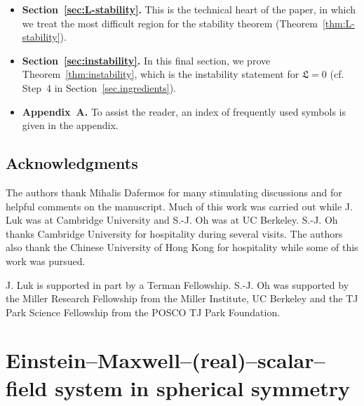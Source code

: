 \documentclass[10pt, reqno]{amsart}
\theoremstyle{definition}
\theoremstyle{remark}
\theoremstyle{conjecture}
\numberwithin{equation}{section}
\newcommand{\0}{\emptyset}
\begin{document}
\begin{itemize}
\item {\bf Section~\ref{sec:L-stability}.} This is the technical heart of the paper, in which we treat the most difficult region for the stability theorem (Theorem~\ref{thm:L-stability}).
\item {\bf Section~\ref{sec:instability}.} In this final section, we prove Theorem~\ref{thm:instability}, which is the instability statement for $\mathfrak L=0$ (cf. Step~4 in Section~\ref{sec.ingredients}).
\item {\bf Appendix~A.} To assist the reader, an index of frequently used symbols is given in the appendix.
\end{itemize}


\subsection*{Acknowledgments} The authors thank Mihalis Dafermos for many stimulating discussions and for helpful comments on the manuscript. Much of this work was carried out while J. Luk was at Cambridge University and S.-J. Oh was at UC Berkeley. S.-J. Oh thanks Cambridge University for hospitality during several visits. The authors also thank the Chinese University of Hong Kong for hospitality while some of this work was pursued. 

J. Luk is supported in part by a Terman Fellowship. S.-J. Oh was supported by the Miller Research Fellowship from the Miller Institute, UC Berkeley and the TJ Park Science Fellowship from the POSCO TJ Park Foundation.

\section{Einstein--Maxwell--(real)--scalar--field system in spherical symmetry}\label{sec.SS}
\end{document}

